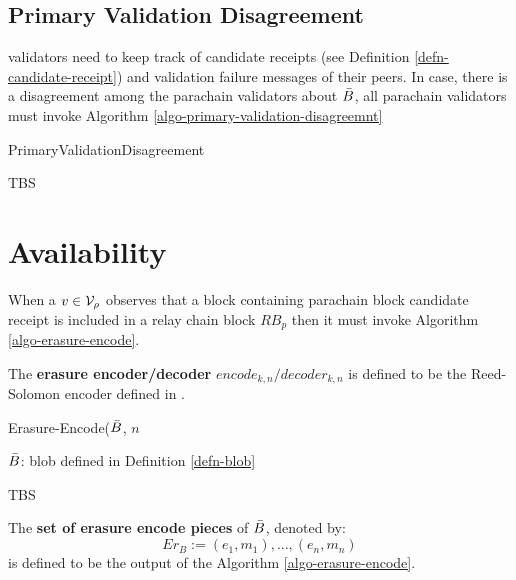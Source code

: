 \subsection{Primary Validation Disagreement}
\label{sect-primary-validation-disagreemnt}
 validators need to keep track of candidate receipts (see Definition \ref{defn-candidate-receipt}) and validation failure messages of their peers. In case, there is a disagreement among the parachain validators about $\bar{B}$, all parachain validators must invoke Algorithm \ref{algo-primary-validation-disagreemnt}

\begin{algorithm}
  \caption[]{\sc PrimaryValidationDisagreement}
  \label{algo-primary-validation-disagreemnt}
  \begin{algorithmic}[1]
    \Require{}

    \State TBS
  \end{algorithmic}
\end{algorithm}

\section{Availability}

When a $v \in \mathcal{V}_\rho$ observes that a block containing parachain block candidate receipt is included in a relay chain block $RB_p$ then it must invoke Algorithm \ref{algo-erasure-encode}.

\begin{definition}
  \label{defn-erasure-encoder-decoder}
  The {\bf erasure encoder/decoder} {\bf $encode_{k,n}/decoder_{k,n}$ } is defined to be the Reed-Solomon encoder defined in \cite{??}.
\end{definition}

\begin{algorithm}
  \caption[]{\sc Erasure-Encode($\bar{B}$, $n$}
  \label{algo-erasure-encode}
  \begin{algorithmic}[1]
  \Require
    $\bar{B}$: blob defined in Definition \ref{defn-blob}

    \State TBS
  \end{algorithmic}
\end{algorithm}

\begin{definition}
  \label{defn-erasure-coded-pieces}
  The {\bf set of erasure encode pieces} of $\bar{B}$, denoted by:
  \[
   Er_B := {(e_1, m_1),...,(e_n,m_n)}
   \]
   is defined to be the output of the Algorithm \ref{algo-erasure-encode}.
\end{definition}

